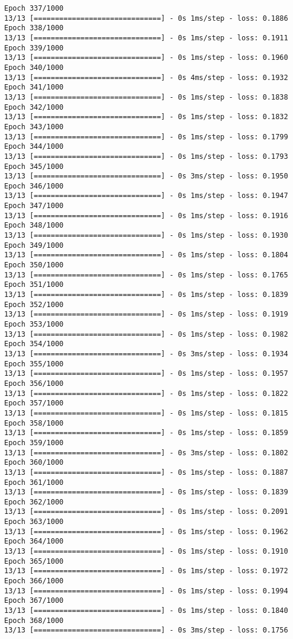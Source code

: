 \documentclass[11pt]{article}
\begin{document}
\begin{Verbatim}[commandchars=\\\{\}]
Epoch 337/1000
13/13 [==============================] - 0s 1ms/step - loss: 0.1886
Epoch 338/1000
13/13 [==============================] - 0s 1ms/step - loss: 0.1911
Epoch 339/1000
13/13 [==============================] - 0s 1ms/step - loss: 0.1960
Epoch 340/1000
13/13 [==============================] - 0s 4ms/step - loss: 0.1932
Epoch 341/1000
13/13 [==============================] - 0s 1ms/step - loss: 0.1838
Epoch 342/1000
13/13 [==============================] - 0s 1ms/step - loss: 0.1832
Epoch 343/1000
13/13 [==============================] - 0s 1ms/step - loss: 0.1799
Epoch 344/1000
13/13 [==============================] - 0s 1ms/step - loss: 0.1793
Epoch 345/1000
13/13 [==============================] - 0s 3ms/step - loss: 0.1950
Epoch 346/1000
13/13 [==============================] - 0s 1ms/step - loss: 0.1947
Epoch 347/1000
13/13 [==============================] - 0s 1ms/step - loss: 0.1916
Epoch 348/1000
13/13 [==============================] - 0s 1ms/step - loss: 0.1930
Epoch 349/1000
13/13 [==============================] - 0s 1ms/step - loss: 0.1804
Epoch 350/1000
13/13 [==============================] - 0s 1ms/step - loss: 0.1765
Epoch 351/1000
13/13 [==============================] - 0s 1ms/step - loss: 0.1839
Epoch 352/1000
13/13 [==============================] - 0s 1ms/step - loss: 0.1919
Epoch 353/1000
13/13 [==============================] - 0s 1ms/step - loss: 0.1982
Epoch 354/1000
13/13 [==============================] - 0s 3ms/step - loss: 0.1934
Epoch 355/1000
13/13 [==============================] - 0s 1ms/step - loss: 0.1957
Epoch 356/1000
13/13 [==============================] - 0s 1ms/step - loss: 0.1822
Epoch 357/1000
13/13 [==============================] - 0s 1ms/step - loss: 0.1815
Epoch 358/1000
13/13 [==============================] - 0s 1ms/step - loss: 0.1859
Epoch 359/1000
13/13 [==============================] - 0s 3ms/step - loss: 0.1802
Epoch 360/1000
13/13 [==============================] - 0s 1ms/step - loss: 0.1887
Epoch 361/1000
13/13 [==============================] - 0s 1ms/step - loss: 0.1839
Epoch 362/1000
13/13 [==============================] - 0s 1ms/step - loss: 0.2091
Epoch 363/1000
13/13 [==============================] - 0s 1ms/step - loss: 0.1962
Epoch 364/1000
13/13 [==============================] - 0s 1ms/step - loss: 0.1910
Epoch 365/1000
13/13 [==============================] - 0s 1ms/step - loss: 0.1972
Epoch 366/1000
13/13 [==============================] - 0s 1ms/step - loss: 0.1994
Epoch 367/1000
13/13 [==============================] - 0s 1ms/step - loss: 0.1840
Epoch 368/1000
13/13 [==============================] - 0s 3ms/step - loss: 0.1756

\end{Verbatim}
\end{document}
